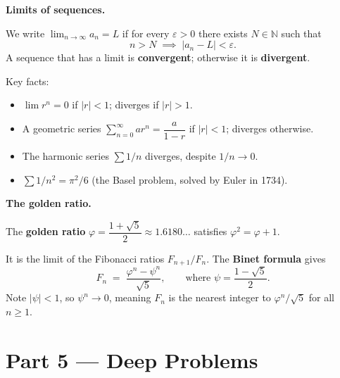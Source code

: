 \documentclass[12pt, a4paper]{article}
\newcounter{problem}
\begin{document}
\begin{namebox}
\textbf{Limits of sequences.}

We write $\lim_{n \to \infty} a_n = L$ if for every $\varepsilon > 0$ there exists $N \in \mathbb{N}$ such that
\[
  n > N \;\implies\; |a_n - L| < \varepsilon.
\]
A sequence that has a limit is \textbf{convergent}; otherwise it is \textbf{divergent}.

Key facts:
\begin{itemize}[topsep=4pt, noitemsep]
  \item $\lim r^n = 0$ if $|r| < 1$; diverges if $|r| > 1$.
  \item A geometric series $\sum_{n=0}^\infty ar^n = \dfrac{a}{1-r}$ if $|r| < 1$; diverges otherwise.
  \item The harmonic series $\sum 1/n$ diverges, despite $1/n \to 0$.
  \item $\sum 1/n^2 = \pi^2/6$ (the Basel problem, solved by Euler in 1734).
\end{itemize}
\end{namebox}

\begin{namebox}
\textbf{The golden ratio.}

The \textbf{golden ratio} $\varphi = \dfrac{1+\sqrt{5}}{2} \approx 1.6180\ldots$ satisfies $\varphi^2 = \varphi + 1$.

It is the limit of the Fibonacci ratios $F_{n+1}/F_n$. The \textbf{Binet formula} gives
\[
  F_n \;=\; \frac{\varphi^n - \psi^n}{\sqrt{5}}, \qquad \text{where } \psi = \frac{1-\sqrt{5}}{2}.
\]
Note $|\psi| < 1$, so $\psi^n \to 0$, meaning $F_n$ is the nearest integer to $\varphi^n/\sqrt{5}$ for all $n \geq 1$.
\end{namebox}

\section{Part 5 \texorpdfstring{---}{--} Deep Problems}
\end{document}
